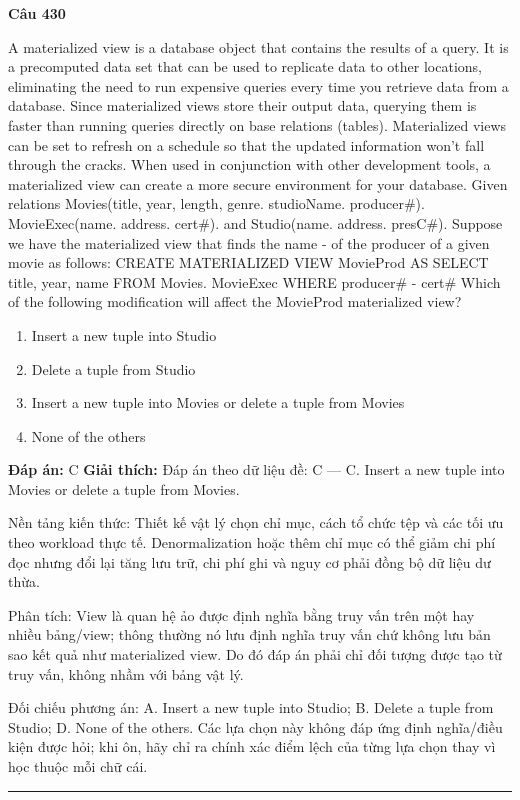 \documentclass[11pt,a4paper]{article}
\newenvironment{question}[1]{%
  \par\vspace{1em}\noindent\textbf{\large Câu #1}\par\vspace{0.4em}
}{%
  \par\vspace{1em}\hrule\vspace{0.6em}
}
\newenvironment{choices}{%
  \begin{enumerate}[label=\textbf{\Alph*.},leftmargin=2.2em,itemsep=2pt,topsep=3pt]
}{%
  \end{enumerate}
}
\newcommand{\choice}{\item}
\begin{document}
\begin{question}{430}
A materialized view is a database object that contains the results of a query. It is a precomputed data set that can be used to replicate data to other locations, eliminating the need to run expensive queries every time you retrieve data from a database. Since materialized views store their output data, querying them is faster than running queries directly on base relations (tables).
Materialized views can be set to refresh on a schedule so that the updated information won't fall through the cracks. When used in conjunction with other development tools, a materialized view can create a more secure environment for your database.
Given relations Movies(title, year, length, genre. studioName. producer#). MovieExec(name. address. cert#). and Studio(name. address. presC#). Suppose we have the materialized view that finds the name - of the producer of a given movie as follows:
CREATE MATERIALIZED VIEW MovieProd AS
SELECT title, year, name
FROM Movies. MovieExec
WHERE producer# - cert#
Which of the following modification will affect the MovieProd materialized view?
\begin{choices}
\choice Insert a new tuple into Studio
\choice Delete a tuple from Studio
\choice Insert a new tuple into Movies or delete a tuple from Movies
\choice None of the others
\end{choices}
\textbf{Đáp án:} C
\textbf{Giải thích:} Đáp án theo dữ liệu đề: C — C. Insert a new tuple into Movies or delete a tuple from Movies.

Nền tảng kiến thức: Thiết kế vật lý chọn chỉ mục, cách tổ chức tệp và các tối ưu theo workload thực tế. Denormalization hoặc thêm chỉ mục có thể giảm chi phí đọc nhưng đổi lại tăng lưu trữ, chi phí ghi và nguy cơ phải đồng bộ dữ liệu dư thừa.

Phân tích: View là quan hệ ảo được định nghĩa bằng truy vấn trên một hay nhiều bảng/view; thông thường nó lưu định nghĩa truy vấn chứ không lưu bản sao kết quả như materialized view. Do đó đáp án phải chỉ đối tượng được tạo từ truy vấn, không nhầm với bảng vật lý.

Đối chiếu phương án: A. Insert a new tuple into Studio; B. Delete a tuple from Studio; D. None of the others. Các lựa chọn này không đáp ứng định nghĩa/điều kiện được hỏi; khi ôn, hãy chỉ ra chính xác điểm lệch của từng lựa chọn thay vì học thuộc mỗi chữ cái.
\end{question}
\end{document}
